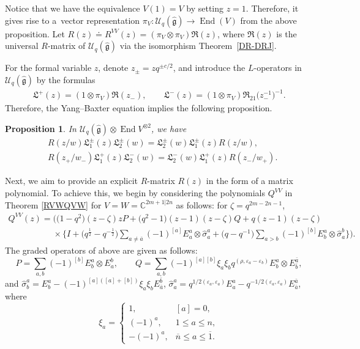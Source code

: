 \documentclass[10pt,a4paper]{amsart}
\numberwithin{equation}{section}
\newtheorem{Proposition}[Theorem]{Proposition}
 { \theoremstyle{definition}
\newtheorem{Definition}[Theorem]{Definition}
\newtheorem{Note}[Theorem]{Note}
\newtheorem{Example}[Theorem]{Example}
\newtheorem{Remark}[Theorem]{Remark} }
\begin{document}
Notice that we have the equivalence $V(1)=V$ by setting $z=1$. Therefore, it gives rise to a~vector representation
 $\pi_V\colon \mathcal{U}_q(\mathfrak{\hat{g}})\rightarrow \operatorname{End}(V)$ from the above proposition.
Let
$R(z)\doteq R^{VV}(z)=(\pi_V\otimes\pi_V)\mathfrak{R}(z)$,
where $\mathfrak{R}(z)$ is the universal $R$-matrix of $\mathcal{U}_q(\mathfrak{\hat{g}})$ via the isomorphism Theorem~\ref{DR-DRJ}.

{For the formal variable $z$, denote
$z_{\pm}=zq^{\pm c/2}$, and introduce the $L$-operators in $\mathcal{U}_q(\mathfrak{\hat{g}})$ by the formulas}
\begin{gather}\label{L-operators}
 \mathfrak{L}^+(z)=(1\otimes \pi_V)\mathfrak{R}(z_-), \qquad \mathfrak{L}^-(z)=(1\otimes \pi_V)\mathfrak{R}_{21}\bigl(z_-^{-1}\bigr)^{-1}.
\end{gather}
Therefore, the Yang--Baxter equation implies the following proposition.

\begin{Proposition}\label{U(ENDV)} In $\mathcal{U}_q(\mathfrak{\hat{g}})\otimes \operatorname{End}V^{\otimes2}$, we have
\begin{align*}
 &R(z/w)\mathfrak{L}_1^{\pm}(z)\mathfrak{L}_2^{\pm}(w)=\mathfrak{L}_2^{\pm}(w)\mathfrak{L}_1^{\pm}(z) R(z/w),\\
 &R(z_+/w_-)\mathfrak{L}_1^{+}(z)\mathfrak{L}_2^{-}(w)=\mathfrak{L}_2^{-}(w)\mathfrak{L}_1^{+}(z) R(z_-/w_+).
\end{align*}
\end{Proposition}

Next, we aim to provide an explicit $R$-matrix
$R(z)$ in the form of a matrix polynomial.
 To achieve this, we begin by considering the polynomials $Q^{VV}$ in Theorem \ref{RVWQVW} for $V=W=\mathbb{C}^{2m+1|2n}$ as follows: for $\zeta=q^{2m-2n-1}$,
\begin{gather*}
 Q^{VV}(z)=\bigl(\bigl(1-q^{2}\bigr)(z-\zeta)zP+\bigl(q^2-1\bigr)(z-1)(z-\zeta)Q+q(z-1)(z-\zeta)\nonumber\\
\phantom{ Q^{VV}(z)=}{}\times \biggl\{I+
 \bigl(q^{\frac{1}{2}}-q^{-\frac{1}{2}}\bigr)\sum\limits_{a\neq \overline{a}}(-1)^{[a]}E^a_a\otimes\hat{\sigma}^a_a+\bigl(q-q^{-1}\bigr)\sum\limits_{a> b}(-1)^{[b]}E^a_b\otimes \hat{\sigma}^b_a\biggr\}\biggr).
\end{gather*}
The graded operators of above are given as follows:
\[
 P=\sum\limits_{a,b}(-1)^{[b]}E^a_b\otimes E^b_a,\qquad
 Q=\sum\limits_{a,b}(-1)^{[a][b]}\xi_a\xi_bq^{(\rho,\varepsilon_a- \varepsilon_b)}E^a_b\otimes E^{\bar{a}}_{\bar{b}},
\]
and
$\hat{\sigma}^a_b=E^a_b-(-1)^{[a]([a]+[b])}\xi_a\xi_bE^{\bar{b}}_{\bar{a}}$, $
 \hat{\sigma}^a_a=q^{1/2(\varepsilon_a, \varepsilon_a)}E^a_a-q^{-1/2(\varepsilon_a, \varepsilon_a)}E^{\bar{a}}_{\bar{a}}$,
 where \[
 \xi_a=
 \begin{cases}
 1,&[a]=0,\\
 (-1)^a,& 1\leq a\leq n,\\
 -(-1)^a,& \overline{n}\leq a\leq \overline{1}.
 \end{cases}
\]
\end{document}
